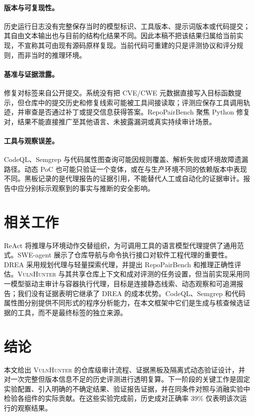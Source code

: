 \documentclass[UTF8,a4paper,11pt,fontset=fandol]{ctexart}
\newcommand{\VH}{\textsc{VulnHunter}}
\newcommand{\DREA}{\textsc{DREA}}
\begin{document}
\paragraph{版本与可复现性。} 历史运行日志没有完整保存当时的模型标识、工具版本、提示词版本或代码提交；其自由文本输出也与目前的结构化结果不同。因此本稿不把该结果归属给当前实现，不宣称其可由现有源码原样复现。当前代码可重建的只是评测协议和评分规则，而非当时的推理环境。

\paragraph{基准与证据泄露。} 修复对标签来自公开提交。系统没有把 CVE/CWE 元数据直接写入目标函数提示，但仓库中的提交历史和修复线索可能被工具间接读取；评测应保存工具调用轨迹，并审查是否通过补丁或提交信息获得答案。RepoPairBench 聚焦 Python 修复对，结果不能直接推广至其他语言、未披露漏洞或真实持续审计场景。

\paragraph{工具与观察误差。} CodeQL、Semgrep 与代码属性图查询可能因规则覆盖、解析失败或环境故障遗漏路径。动态 PoC 也可能只验证一个变体，或在与生产环境不同的依赖版本中表现不同。黑板记录的是代理报告的证据引用，不能替代人工或自动化的证据审计。报告中应分别标示观察到的事实与推断的安全影响。

\section{相关工作}
ReAct 将推理与环境动作交替组织，为可调用工具的语言模型代理提供了通用范式\cite{react2023}。SWE-agent 展示了仓库导航与命令执行接口对软件工程代理的重要性\cite{sweagent2024}。\DREA{} 采用规划代理与轻量探索代理，并提出 RepoPairBench 和推理正确性评估\cite{drea2026}。\VH{} 与其共享仓库上下文和成对评测的任务设置，但当前实现采用同一模型驱动主审计与容器执行代理，目标是连接静态线索、动态观察和可追溯报告；我们没有证据表明它继承了 \DREA{} 的成本优势。CodeQL、Semgrep 和代码属性图分别提供不同形式的程序分析能力\cite{codeqlDocs,semgrepDocs,yamaguchi2014}，在本文框架中它们是生成与核查候选证据的工具，而不是最终标签的独立来源。

\section{结论}
本文给出 \VH{} 的仓库级审计流程、证据黑板及隔离式动态验证设计，并对一次完整但版本信息不足的历史评测进行透明复算。下一阶段的关键工作是固定实验配置、引入明确的不确定结果、验证报告证据，并在同条件对照与消融实验中检验各组件的实际贡献。在这些实验完成前，历史成对正确率 39\% 仅表明该次运行的观察结果。
\end{document}
